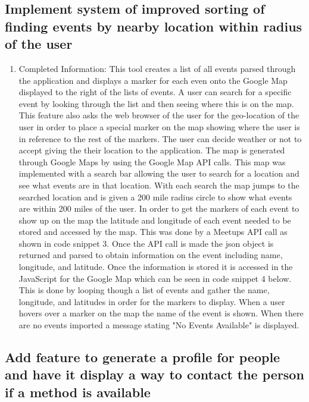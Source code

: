 \documentclass[draftclsnofoot,10pt,onecolumn]{IEEEtran} %
\begin{document}
\begin{enumerate}
\subsection{Implement system of improved sorting of finding events by nearby location within radius of the user}
\begin{enumerate}
  \item Completed Information: This tool creates a list of all events parsed through 
    the application and displays a marker for each even onto the Google Map displayed
    to the right of the lists of events. A user can search for a specific event by looking
    through the list and then seeing where this is on the map. This feature also asks the 
    web browser of the user for the geo-location of the user in order to place a special
    marker on the map showing where the user is in reference to the rest of the markers. The
    user can decide weather or not to accept giving the their location to the application. The map
    is generated through Google Maps by using the Google Map API calls. This map was implemented 
    with a search bar allowing the user to search for a location and see what events are in 
    that location. With each search the map jumps to the searched location and is given a 200 mile radius
    circle to show what events are within 200 miles of the user. In order to get the markers of
    each event to show up on the map the latitude and longitude of each event needed to be stored and
    accessed by the map. This was done by a Meetups API call as shown in code snippet 3. Once the API call
    is made the json object is returned and parsed to obtain information on the event including name,
    longitude, and latitude. Once the information is stored it is accessed in the JavaScript for the 
    Google Map which can be seen in code snippet 4 below. This is done by looping though a list of 
    events and gather the name, longitude, and
    latitudes in order for the markers to display. When a user hovers over a marker on the map the name of
    the event is shown.  When there are no events imported a message stating 
    "No Events Available" is displayed.

\end{enumerate}



\subsection{Add feature to generate a profile for people and have it display a way to contact the person if a method is available}
\begin{enumerate}


\end{enumerate}
\end{enumerate}
\end{document}
